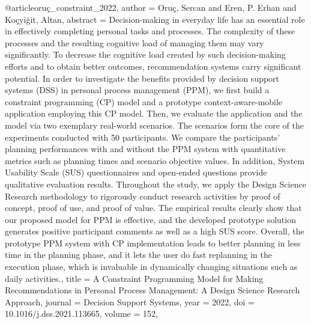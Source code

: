 @article{oruç_constraint_2022,
  author = {Oruç, Sercan and Eren, P. Erhan and Koçyiğit, Altan},
  abstract = {Decision-making in everyday life has an essential role in effectively completing personal tasks and processes. The complexity of these processes and the resulting cognitive load of managing them may vary significantly. To decrease the cognitive load created by such decision-making efforts and to obtain better outcomes, recommendation systems carry significant potential. In order to investigate the benefits provided by decision support systems (DSS) in personal process management (PPM), we first build a constraint programming (CP) model and a prototype context-aware-mobile application employing this CP model. Then, we evaluate the application and the model via two exemplary real-world scenarios. The scenarios form the core of the experiments conducted with 50 participants. We compare the participants’ planning performances with and without the PPM system with quantitative metrics such as planning times and scenario objective values. In addition, System Usability Scale (SUS) questionnaires and open-ended questions provide qualitative evaluation results. Throughout the study, we apply the Design Science Research methodology to rigorously conduct research activities by proof of concept, proof of use, and proof of value. The empirical results clearly show that our proposed model for PPM is effective, and the developed prototype solution generates positive participant comments as well as a high SUS score. Overall, the prototype PPM system with CP implementation leads to better planning in less time in the planning phase, and it lets the user do fast replanning in the execution phase, which is invaluable in dynamically changing situations such as daily activities.},
  title = {{A} {Constraint} {Programming} {Model} {for} {Making} {Recommendations} {in} {Personal} {Process} {Management}: {A} {Design} {Science} {Research} {Approach}},
  journal = {Decision Support Systems},
  year = {2022},
  doi = {10.1016/j.dss.2021.113665},
  volume = {152},
}

